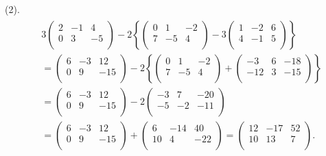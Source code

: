 \documentclass[dvipdfmx,a4paper,11pt]{article}
\theoremstyle{definition}
\begin{document}
(2).
\begin{align*}
\begin{split}
& 3 \begin{pmatrix}
 2 &-1&4 \\
 0&3&-5\\
 \end{pmatrix}
 - 2
 \left\{
 \begin{pmatrix}
 0 &1&-2 \\
 7&-5&4\\
 \end{pmatrix}
 - 3
  \begin{pmatrix}
 1 &-2&6 \\
 4&-1&5\\
 \end{pmatrix}
\right\} \\
&=
\begin{pmatrix}
 6 &-3&12 \\
 0&9&-15\\
 \end{pmatrix}
 - 2
 \left\{
 \begin{pmatrix}
 0 &1&-2 \\
 7&-5&4\\
 \end{pmatrix}
 +
  \begin{pmatrix}
 -3 &6&-18 \\
 -12&3&-15\\
 \end{pmatrix}
\right\} \\
&=
\begin{pmatrix}
 6 &-3&12 \\
 0&9&-15\\
 \end{pmatrix}
-2
 \begin{pmatrix}
 -3&7&-20 \\
 -5&-2&-11\\
 \end{pmatrix}\\
 & = 
 \begin{pmatrix}
 6 &-3&12 \\
 0&9&-15\\
 \end{pmatrix}
 +
 \begin{pmatrix}
 6&-14&40 \\
 10&4&-22\\
 \end{pmatrix}
 =
  \begin{pmatrix}
 12&-17&52 \\
 10&13&7\\
 \end{pmatrix} .
\end{split}
\end{align*}
\end{document}
